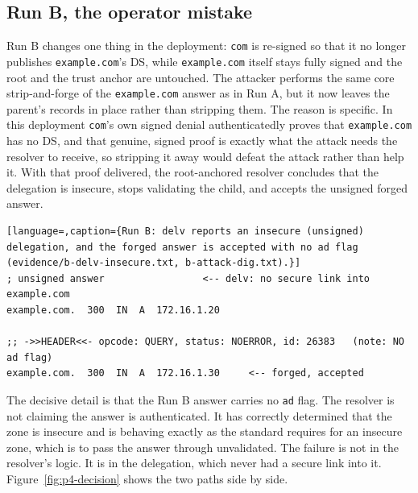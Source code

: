 \documentclass[11pt]{article}
\begin{document}
\subsection{Run B, the operator mistake}

Run B changes one thing in the deployment: \texttt{com} is re-signed so that it no
longer publishes \texttt{example.com}'s DS, while \texttt{example.com} itself stays
fully signed and the root and the trust anchor are untouched. The attacker performs
the same core strip-and-forge of the \texttt{example.com} answer as in Run A, but it
now leaves the parent's records in place rather than stripping them. The reason is
specific. In this deployment \texttt{com}'s own signed denial authenticatedly proves
that \texttt{example.com} has no DS, and that genuine, signed proof is exactly what
the attack needs the resolver to receive, so stripping it away would defeat the
attack rather than help it. With that proof delivered, the root-anchored resolver
concludes that the delegation is insecure, stops validating the child, and accepts
the unsigned forged answer.

\begin{lstlisting}[language=,caption={Run B: delv reports an insecure (unsigned) delegation, and the forged answer is accepted with no ad flag (evidence/b-delv-insecure.txt, b-attack-dig.txt).}]
; unsigned answer                 <-- delv: no secure link into example.com
example.com.  300  IN  A  172.16.1.20

;; ->>HEADER<<- opcode: QUERY, status: NOERROR, id: 26383   (note: NO ad flag)
example.com.  300  IN  A  172.16.1.30     <-- forged, accepted
\end{lstlisting}

The decisive detail is that the Run B answer carries no \texttt{ad} flag. The
resolver is not claiming the answer is authenticated. It has correctly determined
that the zone is insecure and is behaving exactly as the standard requires for an
insecure zone, which is to pass the answer through unvalidated. The failure is not
in the resolver's logic. It is in the delegation, which never had a secure link
into it. Figure~\ref{fig:p4-decision} shows the two paths side by side.

\end{document}
